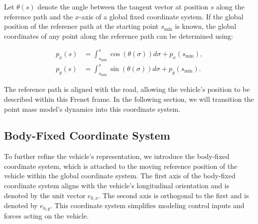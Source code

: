 Let $\theta(s)$ denote the angle between the tangent vector at position $s$ along the reference path and the $x$-axis of a global fixed coordinate
system.
If the global position of the reference path at the starting point $s_{\min}$ is known, the global coordinates of any point along the reference path can be determined using:

\begin{align}
	p_x(s) & = \int_{s_{\min}}^{s} \cos(\theta(\sigma)) d\sigma + p_x(s_{\min}), \\
	p_y(s) & = \int_{s_{\min}}^{s} \sin(\theta(\sigma)) d\sigma + p_y(s_{\min}).
\end{align}

The reference path is aligned with the road, allowing the vehicle's position to be described within this Frenet frame.
In the following section, we will transition the point mass model's dynamics into this coordinate system.

\subsection{Body-Fixed Coordinate System}

To further refine the vehicle's representation, we introduce the body-fixed coordinate system, which is attached to the moving reference position of
the vehicle within the global coordinate system.
The first axis of the body-fixed coordinate system aligns with the vehicle's longitudinal orientation and is denoted by the unit vector $e_{b,x}$.
The second axis is orthogonal to the first and is denoted by $e_{b,y}$.
This coordinate system simplifies modeling control inputs and forces acting on the vehicle.

